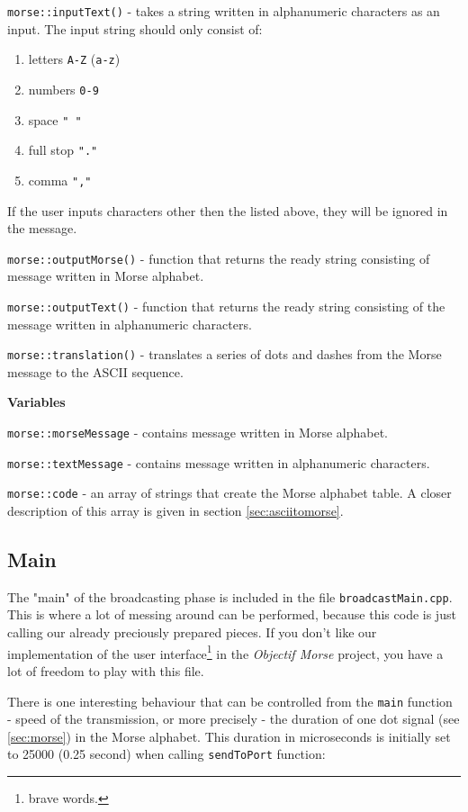 \documentclass[10pt]{report}
\begin{document}
\verb|morse::inputText()| - takes a string written in alphanumeric characters as an input. The input string should only consist of:

\begin{enumerate}
\item letters \verb|A-Z| (\verb|a-z|)
\item numbers \verb|0-9|
\item space \verb|" "|
\item full stop \verb|"."|
\item comma \verb|","|
\end{enumerate}

If the user inputs characters other then the listed above, they will be ignored in the message.

\verb|morse::outputMorse()| - function that returns the ready string consisting of message written in Morse alphabet.

\verb|morse::outputText()| - function that returns the ready string consisting of the message written in alphanumeric characters.

\verb|morse::translation()| - translates a series of dots and dashes from the Morse message to the ASCII sequence.

\textbf{Variables}

\verb|morse::morseMessage| - contains message written in Morse alphabet.

\verb|morse::textMessage| - contains message written in alphanumeric characters.

\verb|morse::code| - an array of strings that create the Morse alphabet table. A closer description of this array is given in section \ref{sec:asciitomorse}.

\subsection{Main}

The "main" of the broadcasting phase is included in the file \verb|broadcastMain.cpp|. This is where a lot of messing around can be performed, because this code is just calling our already preciously prepared pieces. If you don't like our implementation of the user interface\footnote{brave words.} in the \textit{Objectif Morse} project, you have a lot of freedom to play with this file.

There is one interesting behaviour that can be controlled from the \verb|main| function - speed of the transmission, or more precisely - the duration of one dot signal (see \ref{sec:morse}) in the Morse alphabet. This duration in microseconds is initially set to 25000 (0.25 second) when calling \verb|sendToPort| function: 
\end{document}
